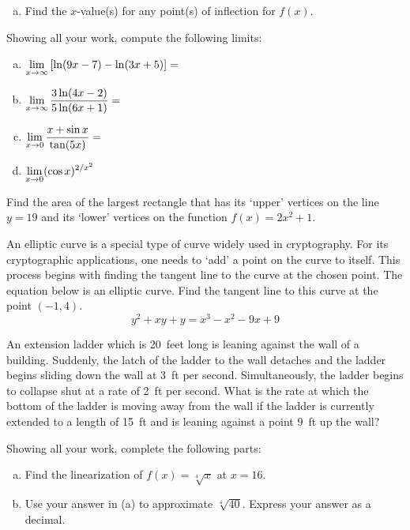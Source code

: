 \documentclass[12pt,letterpaper]{exam}
\begin{document}
\begin{questions}
\begin{enumerate}[(a)]
	\item Find the $x$-value(s) for any point(s) of inflection for $f(x)$. \vfill

	\end{enumerate}



\newpage
\question[16] Showing all your work, compute the following limits: \par\vspace{0.3cm}
	\begin{enumerate}[(a)]
	\item $\displaystyle\lim_{x \to \infty} \left[ \ln(9x - 7) - \ln(3x + 5) \right]=$ \vfill
	\item $\displaystyle\lim_{x \to \infty} \dfrac{3 \ln(4x - 2)}{5 \ln(6x + 1)}=$ \vfill
	
	
	\newpage
	
	\phantom{} \par
	\item $\displaystyle\lim_{x \to 0} \dfrac{x + \sin x}{\tan(5x)}=$ \par\vspace{6cm}
	\item $\displaystyle\lim_{x \to 0} (\cos x)^{2/x^2}$ \vfill
	\end{enumerate}



\newpage
\question[16] Find the area of the largest rectangle that has its `upper' vertices on the line $y= 19$ and its `lower' vertices on the function $f(x)= 2x^2 + 1$. 



\newpage
\question[16] An elliptic curve is a special type of curve widely used in cryptography. For its cryptographic applications, one needs to `add' a point on the curve to itself. This process begins with finding the tangent line to the curve at the chosen point. The equation below is an elliptic curve. Find the tangent line to this curve at the point $(-1, 4)$.
	\[
	y^2 + xy + y= x^3 - x^2 - 9x + 9
	\]



\newpage
\question[16] An extension ladder which is 20~feet long is leaning against the wall of a building. Suddenly, the latch of the ladder to the wall detaches and the ladder begins sliding down the wall at 3~ft per second. Simultaneously, the ladder begins to collapse shut at a rate of 2~ft per second. What is the rate at which the bottom of the ladder is moving away from the wall if the ladder is currently extended to a length of 15~ft and is leaning against a point 9~ft up the wall?



\newpage
\question[16] Showing all your work, complete the following parts:
	\begin{enumerate}[(a)]
	\item Find the linearization of $f(x)= \sqrt[4]{x}$ at $x= 16$. \vspace{4cm}\vfill
	\item Use your answer in (a) to approximate $\sqrt[4]{40}$. Express your answer as a decimal. \vfill
	\end{enumerate}

\end{questions}
\end{document}
